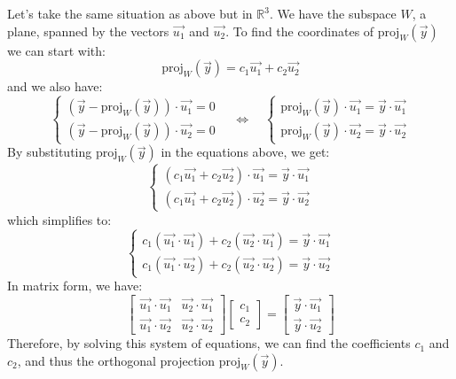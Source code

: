 \begin{eg}
    Let's take the same situation as above but in $\mathbb{R}^3$. We have the subspace $W$, a plane, spanned by the vectors $\vec{u_1}$ and $\vec{u_2}$. To find the coordinates of $\text{proj}_W(\vec{y})$ we can start with:
    \[
        \text{proj}_W(\vec{y}) = c_1 \vec{u_1} + c_2 \vec{u_2}
    \]
    and we also have:
    \[
        \begin{cases*}
            (\vec{y} - \text{proj}_W(\vec{y})) \cdot \vec{u_1} = 0 \\ 
            (\vec{y} - \text{proj}_W(\vec{y})) \cdot \vec{u_2} = 0
        \end{cases*} \quad \iff \quad \begin{cases*}
            \text{proj}_W(\vec{y}) \cdot \vec{u_1} = \vec{y} \cdot \vec{u_1} \\
            \text{proj}_W(\vec{y}) \cdot \vec{u_2} = \vec{y} \cdot \vec{u_2}
        \end{cases*}
    \]
    By substituting $\text{proj}_W(\vec{y})$ in the equations above, we get:
    \[
        \begin{cases*}
            (c_1 \vec{u_1} + c_2 \vec{u_2}) \cdot \vec{u_1} = \vec{y} \cdot \vec{u_1} \\
            (c_1 \vec{u_1} + c_2 \vec{u_2}) \cdot \vec{u_2} = \vec{y} \cdot \vec{u_2}
        \end{cases*}
    \]
    which simplifies to:
    \[
        \begin{cases*}
            c_1 (\vec{u_1} \cdot \vec{u_1}) + c_2 (\vec{u_2} \cdot \vec{u_1}) = \vec{y} \cdot \vec{u_1} \\
            c_1 (\vec{u_1} \cdot \vec{u_2}) + c_2 (\vec{u_2} \cdot \vec{u_2}) = \vec{y} \cdot \vec{u_2}
        \end{cases*}
    \]
    In matrix form, we have:
    \[
        \begin{bmatrix}
            \vec{u_1} \cdot \vec{u_1} & \vec{u_2} \cdot \vec{u_1} \\
            \vec{u_1} \cdot \vec{u_2} & \vec{u_2} \cdot \vec{u_2}
        \end{bmatrix} \begin{bmatrix}
            c_1 \\ c_2
        \end{bmatrix} = \begin{bmatrix}
            \vec{y} \cdot \vec{u_1} \\ \vec{y} \cdot \vec{u_2}
        \end{bmatrix}
    \]
    Therefore, by solving this system of equations, we can find the coefficients $c_1$ and $c_2$, and thus the orthogonal projection $\text{proj}_W(\vec{y})$.
\end{eg}

